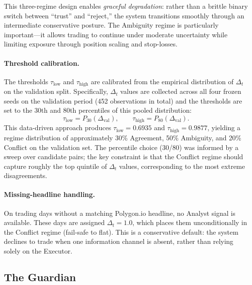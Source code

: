 This three-regime design enables \emph{graceful degradation}: rather than
a brittle binary switch between ``trust'' and ``reject,'' the system
transitions smoothly through an intermediate conservative posture. The
Ambiguity regime is particularly important---it allows trading to continue
under moderate uncertainty while limiting exposure through position scaling
and stop-losses.

\paragraph{Threshold calibration.}
\label{sec:calibration}
The thresholds $\tau_{\mathrm{low}}$ and $\tau_{\mathrm{high}}$ are
calibrated from the empirical distribution of $\Delta_t$ on the validation
split. Specifically, $\Delta_t$ values are collected across all four frozen
seeds on the validation period (452 observations in total) and the
thresholds are set to the 30th and 80th percentiles of this pooled
distribution:
\begin{equation}
  \tau_{\mathrm{low}} = P_{30}(\Delta_{\mathrm{val}}),
  \qquad
  \tau_{\mathrm{high}} = P_{80}(\Delta_{\mathrm{val}}).
\end{equation}
This data-driven approach produces $\tau_{\mathrm{low}} = 0.6935$ and
$\tau_{\mathrm{high}} = 0.9877$, yielding a regime distribution of
approximately 30\% Agreement, 50\% Ambiguity, and 20\% Conflict on the
validation set. The percentile choice (30/80) was informed by a sweep over
candidate pairs; the key constraint is that the Conflict regime should
capture roughly the top quintile of $\Delta_t$ values, corresponding to
the most extreme disagreements.

\paragraph{Missing-headline handling.}
On trading days without a matching Polygon.io headline, no Analyst signal
is available. These days are assigned $\Delta_t = 1.0$, which places them
unconditionally in the Conflict regime (fail-safe to flat). This is a
conservative default: the system declines to trade when one information
channel is absent, rather than relying solely on the Executor.


\subsection{The Guardian}
\label{sec:guardian}


